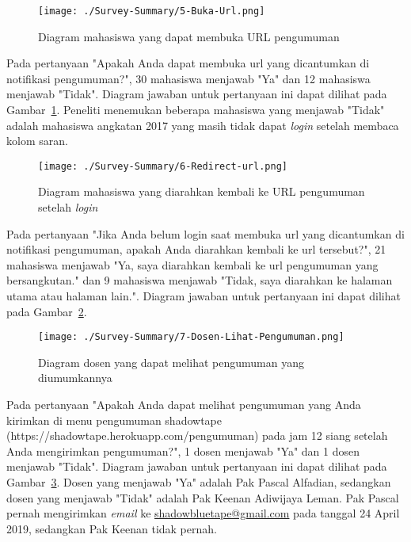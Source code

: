\begin{figure}[H]
	\centering  
	\texttt{[image: ./Survey-Summary/5-Buka-Url.png]}
	\caption[Diagram mahasiswa yang dapat membuka URL pengumuman]{Diagram mahasiswa yang dapat membuka URL pengumuman} 
	\label{fig:summary-5-Buka-Url} 
\end{figure}
Pada pertanyaan "Apakah Anda dapat membuka url yang dicantumkan di notifikasi pengumuman?", 30 mahasiswa menjawab "Ya" dan 12 mahasiswa menjawab "Tidak". Diagram jawaban untuk pertanyaan ini dapat dilihat pada Gambar~\ref{fig:summary-5-Buka-Url}. Peneliti menemukan beberapa mahasiswa yang menjawab "Tidak" adalah mahasiswa angkatan 2017 yang masih tidak dapat \textit{login} setelah membaca kolom saran.

\begin{figure}[H]
	\centering  
	\texttt{[image: ./Survey-Summary/6-Redirect-url.png]}
	\caption[Diagram mahasiswa yang diarahkan kembali ke URL pengumuman setelah \textit{login}]{Diagram mahasiswa yang diarahkan kembali ke URL pengumuman setelah \textit{login}} 
	\label{fig:summary-6-Redirect-url} 
\end{figure}

Pada pertanyaan "Jika Anda belum login saat membuka url yang dicantumkan di notifikasi pengumuman, apakah Anda diarahkan kembali ke url tersebut?", 21 mahasiswa menjawab "Ya, saya diarahkan kembali ke url pengumuman yang bersangkutan." dan 9 mahasiswa menjawab "Tidak,  saya diarahkan ke halaman utama atau halaman lain.". Diagram jawaban untuk pertanyaan ini dapat dilihat pada Gambar~\ref{fig:summary-6-Redirect-url}.

\begin{figure}[H]
	\centering  
	\texttt{[image: ./Survey-Summary/7-Dosen-Lihat-Pengumuman.png]}
	\caption[Diagram dosen yang dapat melihat pengumuman yang diumumkannya]{Diagram dosen yang dapat melihat pengumuman yang diumumkannya} 
	\label{fig:summary-7-Dosen-Lihat-Pengumuman} 
\end{figure}

Pada pertanyaan "Apakah Anda dapat melihat pengumuman yang Anda kirimkan di menu pengumuman shadowtape (https://shadowtape.herokuapp.com/pengumuman) pada jam 12 siang setelah Anda mengirimkan pengumuman?", 1 dosen menjawab "Ya" dan 1 dosen menjawab "Tidak". Diagram jawaban untuk pertanyaan ini dapat dilihat pada Gambar~\ref{fig:summary-7-Dosen-Lihat-Pengumuman}. Dosen yang menjawab "Ya" adalah Pak Pascal Alfadian, sedangkan dosen yang menjawab "Tidak" adalah Pak Keenan Adiwijaya Leman. Pak Pascal pernah mengirimkan \textit{email} ke \href{mailto:shadowbluetape@gmail.com}{shadowbluetape@gmail.com} pada tanggal 24 April 2019, sedangkan Pak Keenan tidak pernah.

